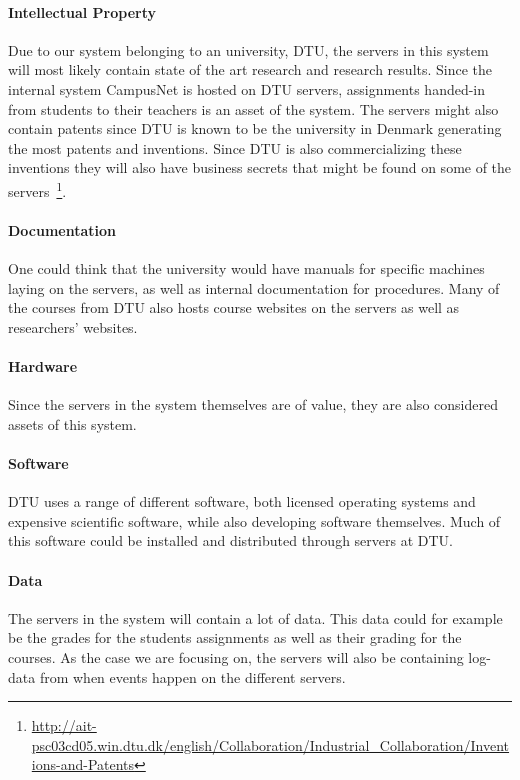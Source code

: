 \paragraph{Intellectual Property}
Due to our system belonging to an university, DTU, the servers in this system will most likely contain state of the art research and research results. Since the internal system CampusNet is hosted on DTU servers, assignments handed-in from students to their teachers is an asset of the system. The servers might also contain patents since DTU is known to be the university in Denmark generating the most patents and inventions. Since DTU is also commercializing these inventions they will also have business secrets that might be found on some of the servers~\footnote{\raggedright \url{ http://ait-psc03cd05.win.dtu.dk/english/Collaboration/Industrial_Collaboration/Inventions-and-Patents}}.

\paragraph{Documentation}
One could think that the university would have manuals for specific machines laying on the servers, as well as internal documentation for procedures. Many of the courses from DTU also hosts course websites on the servers as well as researchers' websites.

\paragraph{Hardware}
Since the servers in the system themselves are of value, they are also considered assets of this system.

\paragraph{Software}
DTU uses a range of different software, both licensed operating systems and expensive scientific software, while also developing software themselves. Much of this software could be installed and distributed through servers at DTU.

\paragraph{Data}
The servers in the system will contain a lot of data. This data could for example be the grades for the students assignments as well as their grading for the courses. As the case we are focusing on, the servers will also be containing log-data from when events happen on the different servers.

